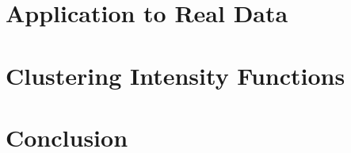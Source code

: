 \documentclass[oneside, 12 pt]{book}
\begin{document}
\chapter{Application to Real Data}\label{chapter 5}



\chapter{Clustering Intensity Functions}\label{chapter 6}



\chapter{Conclusion}\label{chapter 7}






 
 
\end{document}

